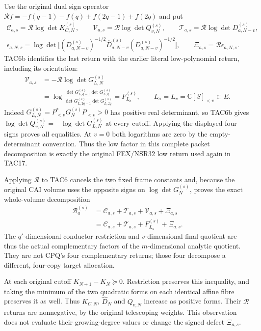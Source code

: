 Use the original dual sign operator
$\mathcal R f=-f(q-1)-f(q)+f(2q-1)+f(2q)$ and put
\[
 \begin{gathered}
 \mathcal C_{a,s}=\mathcal R\log\det K_{C,N}^{(s)},\qquad
 \mathcal V_{a,s}=\mathcal R\log\det Q_{v,N}^{(s)},\qquad
 \mathcal T_{a,s}=\mathcal R\log\det D_{a,N-v}^{(s)},\\
 \epsilon_{a,N,s}=\log\det\bigl[(D_{a,N-v}^{(s)})^{-1/2}
          \widehat D_{a,N-v}^{(s)}(D_{a,N-v}^{(s)})^{-1/2}\bigr],
 \qquad \Xi_{a,s}=\mathcal R\epsilon_{a,N,s}.
 \end{gathered}
 \tag{TAC9}
\]
TAC6b identifies the last return with the earlier literal low-polynomial
return, including its orientation:
\[
\begin{aligned}
 \mathcal V_{a,s}
  &=-\mathcal R\log\det G_{L,N}^{(s)}\\
  &=\log\frac{\det G_{L,q-1}^{(s)}\det G_{L,q}^{(s)}}
                 {\det G_{L,2q-1}^{(s)}\det G_{L,2q}^{(s)}}
    =F_{L_a}^{(s)},\qquad L_a=L_v=\mathbb C[S]_{<v}\subset E .
\end{aligned}\tag{TAC9a}
\]
Indeed $G_{L,N}^{(s)}=P_{<v}^*G_N^{(s)}P_{<v}>0$ has positive
real determinant, so TAC6b gives
$\log\det Q_{v,N}^{(s)}=-\log\det G_{L,N}^{(s)}$ at every cutoff.
Applying the displayed four signs proves all equalities. At $v=0$
both logarithms are zero by the empty-determinant convention. Thus the
low factor in this complete packet decomposition is exactly the
original FEX/NSR32 low return used again in TAC17.

Applying $\mathcal R$ to TAC6 cancels the two fixed frame constants
and, because the original CAI volume uses the opposite signs on
$\log\det G_N^{(s)}$, proves the exact whole-volume decomposition
\[
 \boxed{\begin{aligned}
 \mathcal B_a^{(s)}
   &=\mathcal C_{a,s}+\mathcal T_{a,s}+\mathcal V_{a,s}+\Xi_{a,s}\\
   &=\mathcal C_{a,s}+\mathcal T_{a,s}+F_{L_a}^{(s)}+\Xi_{a,s}.
\end{aligned}}
 \tag{TAC10}
\]
The $q'$-dimensional conductor restriction and $v$-dimensional final
quotient are thus the actual complementary factors of the $m$-dimensional
analytic quotient.  They are not CPQ's four complementary returns;
those four decompose a different, four-copy target allocation.

At each original cutoff $K_{N+1}-K_N\succeq0$.  Restriction preserves
this inequality, and taking the minimum of the two quadratic forms on
each identical affine fibre preserves it as well.  Thus $K_{C,N}$,
$\widehat D_N$ and $Q_{v,N}$ increase as positive forms.  Their
$\mathcal R$ returns are nonnegative, by the original telescoping
weights.  This observation does not evaluate their growing-degree
values or change the signed defect $\Xi_{a,s}$.

